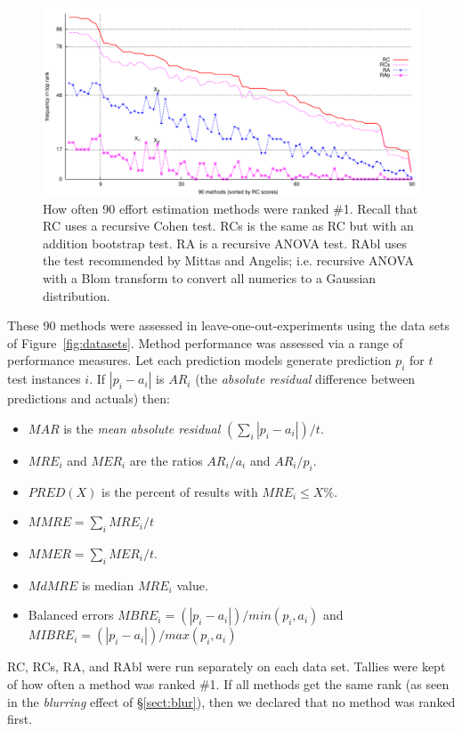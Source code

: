 \documentclass{sig-alternate}
\newcommand{\bi}{\begin{itemize}}
\newcommand{\ei}{\end{itemize}}
\newcommand{\tion}[1]{\S\ref{sect:#1}}
\newcommand{\fig}[1]{Figure~\ref{fig:#1}}
\begin{document}
\begin{figure}
\begin{center}
\includegraphics[width=6in]{row-numers.pdf}
\end{center}
\caption{How often 90 effort estimation methods were ranked \#1.
Recall that RC
uses a recursive Cohen test.
 RCs is the same as RC but with an addition
bootstrap test.
 RA is a
recursive ANOVA
test.
 RAbl uses
 the test recommended by Mittas and Angelis; i.e.
 recursive ANOVA with a Blom transform to convert all numerics to a Gaussian
distribution.
}\label{fig:results}
\end{figure}


These 90 methods were assessed in
 leave-one-out-experiments using the data sets of \fig{datasets}.
Method performance was assessed via a range of
 performance measures. Let each
prediction models generate prediction $p_i$ for  $t$ test instances $i$.
If $|p_i - a_i|$ is $AR_i$ 
(the  {\em absolute residual}  difference between  predictions and actuals)
then:
\bi
\item
$MAR$ is the {\em mean absolute residual} $(\sum_i |p_i - a_i|)/t$.
\item
$MRE_i$ and $MER_i$ are the ratios  $AR_i/a_i$ and  $AR_i/p_i$.
\item
$PRED(X)$ is the percent of results with $MRE_i \le X\%$.
\item
$MMRE =\sum_i MRE_i/t$
\item
$MMER = \sum_i MER_i/t$.
\item
$MdMRE$ is median $MRE_i$ value. 
\item
Balanced errors
\mbox{$MBRE_i = (|p_i - a_i |)/ min(p_i,a_i)$} and \newline
\mbox{$MIBRE_i = (|p_i - a_i |)/ max(p_i,a_i)$}
\ei 

RC, RCs, RA, and RAbl were run separately on each data set.
Tallies were kept of how often a method was ranked \#1.
If all methods get the same rank (as seen in the {\em blurring}
effect of \tion{blur}),
then we declared that no method was ranked first.
\end{document}
